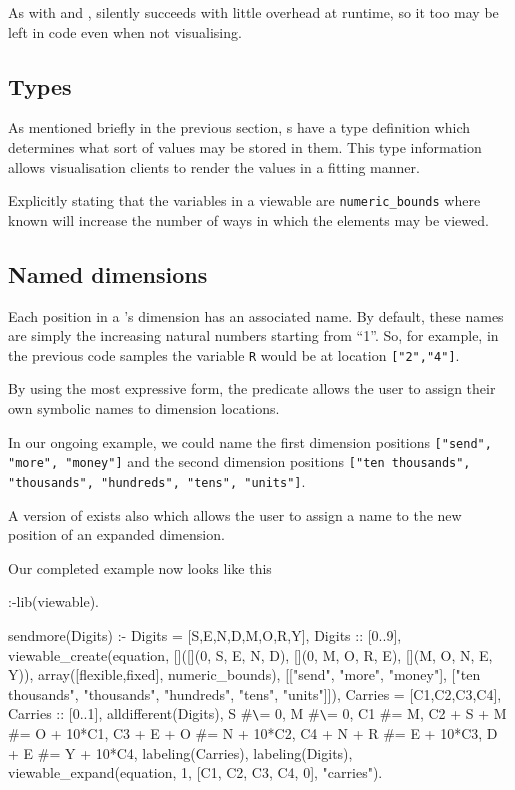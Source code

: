 As with \viewablecreatetwo{} and \viewablecreatethree{},
\viewableexpandthree{} silently succeeds with little overhead at
runtime, so it too may be left in code even when not visualising.


\subsection{Types}

As mentioned briefly in the previous section, \viewable{}s have a type
definition which determines what sort of values may be stored in them.
This type information allows visualisation clients to render the
values in a fitting manner.

Explicitly stating that the variables in a viewable are
\texttt{numeric_bounds} where known will increase the number
of ways in which the
\viewable{} elements may be viewed.


\subsection{Named dimensions}

Each position in a \viewable{}'s dimension has an associated name.  By
default, these names are simply the increasing natural numbers
starting from ``1''.  So, for example, in the previous code samples
the variable \texttt{R} would be at location \texttt{["2","4"]}.

By using the most expressive form, the \viewablecreatefour{} predicate
allows the user to assign their own symbolic names to dimension
locations.

In our ongoing example, we could name the first dimension positions
\texttt{["send", "more", "money"]} and the second dimension positions
\texttt{["ten thousands", "thousands", "hundreds", "tens", "units"]}.

A version of \viewableexpandfour{} exists also which allows the user to
assign a name to the new position of an expanded dimension.

Our completed example now looks like this

\begin{code}
:-lib(viewable).

sendmore(Digits) :-
    Digits = [S,E,N,D,M,O,R,Y],
    Digits :: [0..9],
    viewable_create(equation,
                    []([](0, S, E, N, D),
                       [](0, M, O, R, E),
                       [](M, O, N, E, Y)),
                    array([flexible,fixed], numeric_bounds),
                    [["send", "more", "money"],
                     ["ten thousands", "thousands",
                      "hundreds", "tens", "units"]]),
    Carries = [C1,C2,C3,C4],
    Carries :: [0..1],
    alldifferent(Digits),
    S #\verb+\+= 0,
    M #\verb+\+= 0,
    C1         #= M,
    C2 + S + M #= O + 10*C1,
    C3 + E + O #= N + 10*C2,
    C4 + N + R #= E + 10*C3,
         D + E #= Y + 10*C4,
    labeling(Carries),
    labeling(Digits),
    viewable_expand(equation, 1, [C1, C2, C3, C4, 0], "carries").
\end{code}

